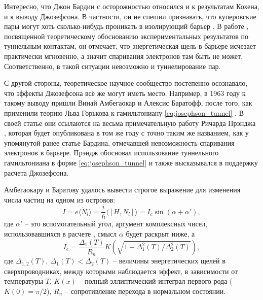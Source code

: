 \documentclass[14pt, a4paper]{extreport}
\numberwithin{equation}{section}
\begin{document}
Интересно, что Джон Бардин с осторожностью относился и к результатам Кохена, и к выводу Джозефсона. В частности, он не спешил признавать, что куперовские пары могут хоть сколько-нибудь проникать в изолирующий барьер \cite{josephsonnobel}. В работе \cite{bardeen1961tunnelling}, посвященной теоретическому обоснованию экспериментальных результатов по туннельным контактам, он отмечает, что энергетическая щель в барьере исчезает практически мгновенно, а значит спаривания электронов там быть не может. Соответственно, в такой ситуации невозможно и туннелирование пар.

С другой стороны, теоретическое научное сообщество постепенно осознавало, что эффекты Джозефсона всё же могут иметь место. Например, в 1963 году к такому выводу пришли Винай Амбегаокар и Алексис Баратофф, после того, как применили теорию Льва Горькова к гамильтониану \eqref{eq:josephson_tunnel} \cite{ambegaokar1963tunneling}. В своей статье они ссылаются на весьма примечательную работу Ричарда Прэнджа \cite{prange1963tunneling}, которая будет опубликована в том же году с точно таким же названием, как у упомянутой ранее статье Бардина, отмечавшей невозможность спаривания электронов в барьере. Прэндж обосновал использование туннельного гамильтониана в форме \eqref{eq:josephson_tunnel} и также высказывался в поддержку расчета Джозефсона.

Амбегаокару и Баратову удалось вывести строгое выражение для изменения числа частиц на одном из островов:
\begin{equation}
	I = e \langle \dot N_l \rangle =  \frac{i}{\hbar}\langle [H, N_l] \rangle = I_c \sin(\alpha + \alpha'),
\end{equation}
где $\alpha'$ -- это вспомогательный угол, аргумент комплексных чисел, использовавшихся в расчете , смысл $\alpha$ будет раскрыт ниже, а 
\begin{equation}
	I_c = \frac{\Delta_1(T)}{R_n} K \left(\sqrt{1 - \Delta_1^2(T)/\Delta_2^2(T)}\right),
\end{equation}
где $\Delta_{1,2}(T),\ \Delta_1(T) < \Delta_2(T)$ -- величины энергетических щелей в сверхпроводниках, между которыми наблюдается эффект, в зависимости от температуры $T$, $K(x)$ -- полный эллиптический интеграл первого рода ($K(0) = \pi/2$), $R_n$ -- сопротивление перехода в нормальном состоянии.
\end{document}
